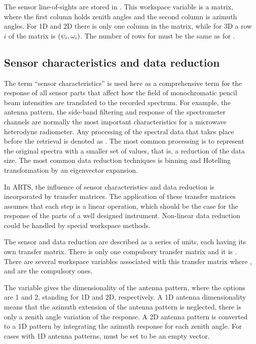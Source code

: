 The sensor line-of-sights are stored in . This
workspace variable is a matrix, where the first column holds zenith
angles and the second column is azimuth angles. For 1D and 2D there is
only one column in the matrix, while for 3D a row $i$ of the matrix is
$(\psi_{i},\omega_{i})$. The number of rows for
 must be the same as for
.


\subsection{Sensor characteristics and data reduction}
\label{sec:fm_defs:sensorchar}

The term ``sensor characteristics'' is
used here as a comprehensive term for the response of all sensor parts
that affect how the field of monochromatic pencil beam intensities are
translated to the recorded spectrum. For example, the antenna pattern,
the side-band filtering and response of the spectrometer channels are
normally the most important characteristics for a microwave heterodyne
radiometer. Any processing of the spectral data that takes place
before the retrieval is denoted as . The
most common processing is to represent the original spectra with a
smaller set of values, that is, a reduction of the data size. The most
common data reduction techniques is binning and Hotelling
transformation by an eigenvector expansion.

In ARTS, the influence of sensor characteristics and data reduction is
incorporated by transfer matrices. The
application of these transfer matrices assumes that each step is a
linear operation, which should be the case for the response of the
parts of a well designed instrument. Non-linear data reduction could
be handled by special workspace methods.

The sensor and data reduction are described as a series of units, each
having its own transfer matrix.  There is only one compulsory transfer
matrix and it is . There are several workspace
variables associated with this transfer matrix where
,  and
 are the compulsory ones.

The variable  gives the dimensionality of the
antenna pattern, where the
options are 1 and 2, standing for 1D and 2D, respectively. A 1D
antenna dimensionality means that the azimuth extension of the
antenna pattern is neglected, there is only a zenith angle variation
of the response. A 2D antenna pattern is converted to a 1D pattern by
integrating the azimuth response for each zenith angle. For cases
with 1D antenna patterns,  must be set to
be an empty vector.


